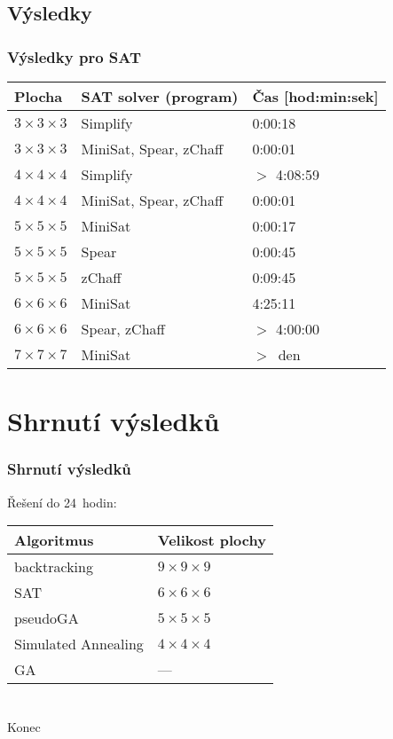 \documentclass{beamer}
\begin{document}
\subsection{Výsledky}

\begin{frame}
\frametitle{Výsledky pro SAT}

\centering
\begin{tabular}{|l|l|l|}
\hline
\textbf{Plocha} & \textbf{SAT solver (program)} & \textbf{Čas [hod:min:sek]} \\
\hline
$3 \times 3 \times 3$ & Simplify & 0:00:18 \\
$3 \times 3 \times 3$ & MiniSat, Spear, zChaff & 0:00:01 \\
$4 \times 4 \times 4$ & Simplify & $>$ 4:08:59 \\
$4 \times 4 \times 4$ & MiniSat, Spear, zChaff & 0:00:01 \\
$5 \times 5 \times 5$ & MiniSat & 0:00:17 \\
$5 \times 5 \times 5$ & Spear & 0:00:45 \\
$5 \times 5 \times 5$ & zChaff & 0:09:45 \\
$6 \times 6 \times 6$ & MiniSat & 4:25:11 \\
$6 \times 6 \times 6$ & Spear, zChaff & $>$ 4:00:00 \\
$7 \times 7 \times 7$ & MiniSat & $>$~den \\
\hline
\end{tabular}

\end{frame}


\section{Shrnutí výsledků}

\begin{frame}
\frametitle{Shrnutí výsledků}

Řešení do 24~hodin: \vskip 0.5cm
\centering
\begin{tabular}{|l|l|}
\hline
\textbf{Algoritmus} & \textbf{Velikost plochy} \\
\hline
backtracking & $9 \times 9 \times 9$ \\
SAT & $6 \times 6 \times 6$ \\
pseudoGA & $5 \times 5 \times 5$ \\
Simulated Annealing & $4 \times 4 \times 4$ \\
GA & --- \\
\hline
\end{tabular}

\end{frame}


\section*{}

\begin{frame}
\centering
Konec\\
\end{frame}
\end{document}
